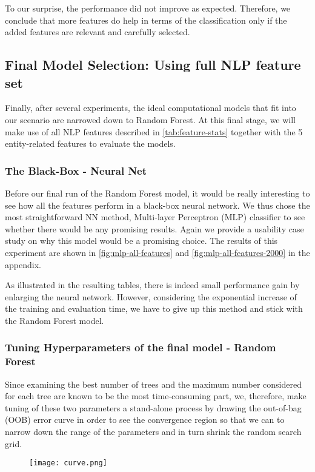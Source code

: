 To our surprise, the performance did not improve as expected.
Therefore, we conclude that more features do help in terms of the classification only if the added features are relevant and carefully selected.

\subsection{Final Model Selection: Using full NLP feature set}
Finally, after several experiments, the ideal computational models that fit into our scenario are narrowed down to Random Forest.
At this final stage, we will make use of all NLP features described in \autoref{tab:feature-stats} together with the 5 entity-related features to evaluate the models.

\subsubsection{The Black-Box - Neural Net }
Before our final run of the Random Forest model, it would be really interesting to see how all the features perform in a black-box neural network.
We thus chose the most straightforward NN method, Multi-layer Perceptron (MLP) classifier \cite{x6} to see whether there would be any promising results.
Again we provide a usability case study \cite{8} on why this model would be a promising choice. The results of this experiment are shown in \autoref{fig:mlp-all-features} and \autoref{fig:mlp-all-features-2000} in the appendix.

As illustrated in the resulting tables, there is indeed small performance gain by enlarging the neural network.
However, considering the exponential increase of the training and evaluation time, we have to give up this method and stick with the Random Forest model.

\subsubsection{Tuning Hyperparameters of the final model - Random Forest}
Since examining the best number of trees and the maximum number considered for each tree are known to be the most time-consuming part, we, therefore,
make tuning of these two parameters a stand-alone process by drawing the out-of-bag (OOB) error curve \cite{x7} in order to see the convergence region so that we can to narrow down the range of the parameters and in turn shrink the random search grid.

\begin{figure}[h]
  \centering
  \texttt{[image: curve.png]}
  \caption{}
  \label{fig:curve}
\end{figure}


